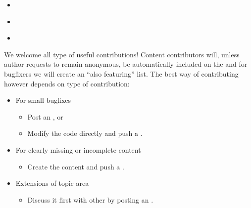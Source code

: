 \documentclass[letterpaper,10pt,english]{jupyterBook}
\begin{document}
\begin{itemize}
\item {} 
\sphinxAtStartPar
{\hyperref[\detokenize{Computational_models_of_human_language_processing::doc}]{}}

\item {} 
\sphinxAtStartPar
{\hyperref[\detokenize{Security_and_privacy::doc}]{}}

\item {} 
\sphinxAtStartPar
{\hyperref[\detokenize{References::doc}]{}}

\end{itemize}

\begin{DUlineblock}{0em}
\item[] 
\end{DUlineblock}

\sphinxAtStartPar
We welcome all type of useful contributions! Content contributors will, unless author requests to remain anonymous, be automatically included on the  and for bugfixers we will create an “also featuring” list.
The best way of contributing however depends on type of contribution:
\begin{itemize}
\item {} 
\sphinxAtStartPar
For small bugfixes
\begin{itemize}
\item {} 
\sphinxAtStartPar
Post an , or

\item {} 
\sphinxAtStartPar
Modify the code directly and push a .

\end{itemize}

\item {} 
\sphinxAtStartPar
For clearly missing or incomplete content
\begin{itemize}
\item {} 
\sphinxAtStartPar
Create the content and push a .

\end{itemize}

\item {} 
\sphinxAtStartPar
Extensions of topic area
\begin{itemize}
\item {} 
\sphinxAtStartPar
Discuss it first with other by posting an .

\end{itemize}

\end{itemize}
\end{document}
